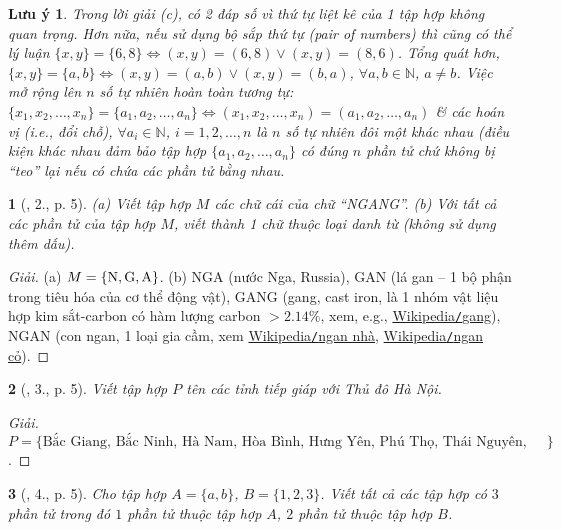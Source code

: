 \documentclass{article}
\newtheorem{baitoan}{}
\newtheorem{luuy}{Lưu ý}
\begin{document}
\begin{luuy}
	Trong lời giải (c), có 2 đáp số vì thứ tự liệt kê của 1 tập hợp không quan trọng. Hơn nữa, nếu sử dụng bộ sắp thứ tự (pair of numbers) thì cũng có thể lý luận $\{x,y\} = \{6,8\}\Leftrightarrow(x,y) = (6,8)\lor(x,y) = (8,6)$. Tổng quát hơn, $\{x,y\} = \{a,b\}\Leftrightarrow(x,y) = (a,b)\lor(x,y) = (b,a)$, $\forall a,b\in\mathbb{N}$, $a\ne b$. Việc mở rộng lên $n$ số tự nhiên hoàn toàn tương tự: $\{x_1,x_2,\ldots,x_n\} = \{a_1,a_2,\ldots,a_n\}\Leftrightarrow(x_1,x_2,\ldots,x_n) = (a_1,a_2,\ldots,a_n)$ \& các hoán vị (i.e., đổi chỗ), $\forall a_i\in\mathbb{N}$, $i = 1,2,\ldots,n$ là $n$ số tự nhiên đôi một khác nhau (điều kiện khác nhau đảm bảo tập hợp $\{a_1,a_2,\ldots,a_n\}$ có đúng $n$ phần tử chứ không bị ``teo'' lại nếu có chứa các phần tử bằng nhau.
\end{luuy}

\begin{baitoan}[\cite{Tuyen_Toan_6}, 2., p. 5]
	(a) Viết tập hợp $M$ các chữ cái của chữ {\rm``NGANG''}. (b) Với tất cả các phần tử của tập hợp $M$, viết thành 1 chữ thuộc loại danh từ (không sử dụng thêm dấu).
\end{baitoan}

\begin{proof}[Giải]
	(a) $M = \{{\rm N,G,A}\}$. (b) NGA (nước Nga, Russia), GAN (lá gan -- 1 bộ phận trong tiêu hóa của cơ thể động vật), GANG (gang, cast iron, là 1 nhóm vật liệu hợp kim sắt-carbon có hàm lượng carbon $> 2.14\%$, xem, e.g., \href{https://vi.wikipedia.org/wiki/Gang}{Wikipedia{\tt/}gang}), NGAN (con ngan, 1 loại gia cầm, xem \href{https://vi.wikipedia.org/wiki/Ngan_nh%C3%A0}{Wikipedia{\tt/}ngan nhà}, \href{https://vi.wikipedia.org/wiki/Ngan_c%E1%BB%8F}{Wikipedia{\tt/}ngan cỏ}).
\end{proof}

\begin{baitoan}[\cite{Tuyen_Toan_6}, 3., p. 5]
	Viết tập hợp $P$ tên các tỉnh tiếp giáp với Thủ đô Hà Nội.
\end{baitoan}

\begin{proof}[Giải]
	$P = \{\mbox{Bắc Giang, Bắc Ninh, Hà Nam, Hòa Bình, Hưng Yên, Phú Thọ, Thái Nguyên, Vĩnh Phúc}\}$.
\end{proof}

\begin{baitoan}[\cite{Tuyen_Toan_6}, 4., p. 5]
	Cho tập hợp $A = \{a,b\}$, $B = \{1,2,3\}$. Viết tất cả các tập hợp có $3$ phần tử trong đó $1$ phần tử thuộc tập hợp $A$, $2$ phần tử thuộc tập hợp $B$.
\end{baitoan}
\end{document}
